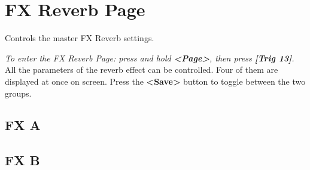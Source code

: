 \chapter{FX Reverb Page}
Controls the master FX Reverb settings.

\textit{To enter the FX Reverb Page: press and hold \textbf{<Page>}, then press \textbf{[Trig 13]}.}
All the parameters of the reverb effect can be controlled. Four of them are displayed at once on screen. Press the \textbf{<Save>} button to toggle between the two groups.

\section{FX A}

\newpage
\section{FX B}

